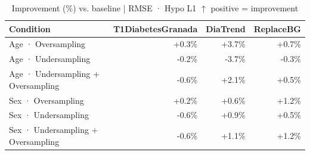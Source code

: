 \begin{table}[htbp]
\centering
\small
\caption{Improvement (\%) vs. baseline  |  RMSE · Hypo L1  $\uparrow$ positive = improvement}
\label{tab:delta_rmse_tbr_1_family_mechanism_random}
\begin{tabular}{lrrr}
\toprule
\textbf{Condition} & \textbf{T1DiabetesGranada} & \textbf{DiaTrend} & \textbf{ReplaceBG} \\
\midrule
Age · Oversampling & \textcolor{OliveGreen}{+0.3\%} & \textcolor{OliveGreen}{+3.7\%} & \textcolor{OliveGreen}{+0.7\%} \\
Age · Undersampling & \textcolor{BrickRed}{-0.2\%} & \textcolor{BrickRed}{-3.7\%} & \textcolor{BrickRed}{-0.3\%} \\
Age · Undersampling + Oversampling & \textcolor{BrickRed}{-0.6\%} & \textcolor{OliveGreen}{+2.1\%} & \textcolor{OliveGreen}{+0.5\%} \\
\midrule
Sex · Oversampling & \textcolor{OliveGreen}{+0.2\%} & \textcolor{OliveGreen}{+0.6\%} & \textcolor{OliveGreen}{+1.2\%} \\
Sex · Undersampling & \textcolor{BrickRed}{-0.6\%} & \textcolor{OliveGreen}{+0.9\%} & \textcolor{OliveGreen}{+0.5\%} \\
Sex · Undersampling + Oversampling & \textcolor{BrickRed}{-0.6\%} & \textcolor{OliveGreen}{+1.1\%} & \textcolor{OliveGreen}{+1.2\%} \\
\bottomrule
\end{tabular}
\end{table}